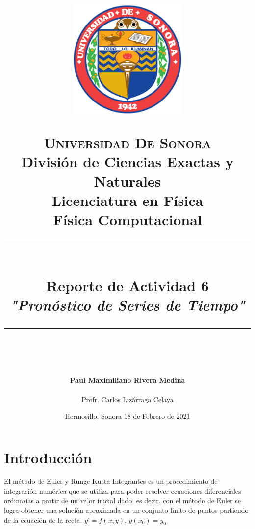 \documentclass{article}
\newcommand{\HRule}[1]{\rule{\linewidth}{#1}}
\begin{document}
\begin{titlepage}

\title{ \normalsize 
        \begin{center}
        \includegraphics[height=6cm]{Logo.jpg}
        \end{center}
        \LARGE \textsc{\textbf{Universidad De Sonora}} \\ \bigskip
		\Large División de Ciencias Exactas y Naturales \\
        Licenciatura en Física \\ \bigskip
        \bigskip
       Física Computacional
		\\ [0.1cm]  
		\HRule{2pt} \\
		\Large \textbf{{Reporte de Actividad 6}} \\
        \textit{\textbf{"Pronóstico de Series de Tiempo"}}
		\HRule{2pt} \\
		\normalsize \vspace*{0.001\baselineskip}}
        
\date{\bigskip \Large Hermosillo, Sonora  \hspace*{\fill}  18 de Febrero de 2021}

\author{
		\Large\textbf{Paul Maximiliano Rivera Medina} \\ \bigskip
        \\ \bigskip
       \Large Profr. Carlos Lizárraga Celaya}
       \end{titlepage}
       \maketitle

\newpage

\section{\LARGE Introducción}
El método de Euler y Runge Kutta Integrantes es un procedimiento de integración numérica que se utiliza para poder resolver ecuaciones diferenciales ordinarias a partir de un valor inicial dado, es decir, con el método de Euler se logra obtener una solución aproximada en un conjunto finito de puntos partiendo de la ecuación de la recta. $y’ = f(x, y)$, $y(x_0) = y_0$
\large\textbf{}  
\end{document}
